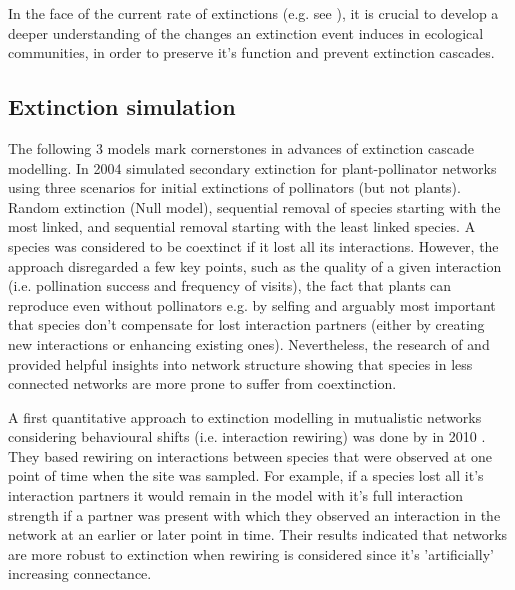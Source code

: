 \documentclass[12pt,a4paper]{article}
\begin{document}


In the face of the current rate of extinctions (e.g. see \cite{IPBES}), it is crucial to develop a deeper understanding of the changes an extinction event induces in ecological communities, in order to preserve it's function and prevent extinction cascades. 
\subsection{Extinction simulation}
The following 3 models mark cornerstones in advances of extinction cascade modelling. In 2004 \citeauthor{Memmott2004} simulated secondary extinction for plant-pollinator networks using three scenarios for initial extinctions of pollinators (but not plants). Random extinction (Null model), sequential removal of species starting with the most linked, and sequential removal starting with the least linked species. A species was considered to be coextinct if it lost all its interactions. However, the approach disregarded a few key points, such as the quality of a given interaction (i.e. pollination success and frequency of visits), the fact that plants can reproduce even without pollinators e.g. by selfing and arguably most important that species don't compensate for lost interaction partners (either by creating new interactions or enhancing existing ones). Nevertheless, the research of \citeauthor{Dunne2002} and \citeauthor{Memmott2004} provided helpful insights into network structure showing that species in less connected networks are more prone to suffer from coextinction. \par

A first quantitative approach to extinction modelling in mutualistic networks considering behavioural shifts (i.e. interaction rewiring) was done by \citeauthor{Kaiser-Bunbury2010} in 2010 \parencite{Kaiser-Bunbury2010}. They based rewiring on interactions between species that were observed at one point of time when the site was sampled. For example, if a species lost all it's interaction partners it would remain in the model with it's full interaction strength if a partner was present with which they observed an interaction in the network at an earlier or later point in time. Their results indicated that networks are more robust to extinction when rewiring is considered since it's 'artificially' increasing connectance. \par
\end{document}
